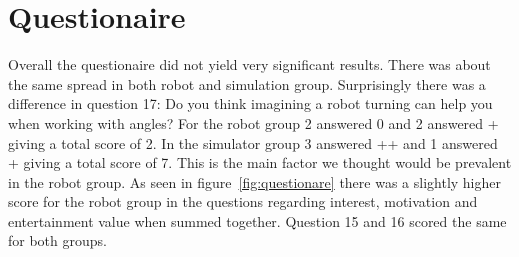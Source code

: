 \chapter{Questionaire}
Overall the questionaire did not yield very significant results. There was about the same spread in both robot and simulation group. Surprisingly there was a difference in question 17: Do you think imagining a robot turning can help you when working with angles? For the robot group 2 answered 0 and 2 answered + giving a total score of 2. In the simulator group 3 answered ++ and 1 answered + giving a total score of 7. This is the main factor we thought would be prevalent in the robot group. As seen in figure~\ref{fig:questionare} there was a slightly higher score for the robot group in the questions regarding interest, motivation and entertainment value when summed together. Question 15 and 16 scored the same for both groups.

